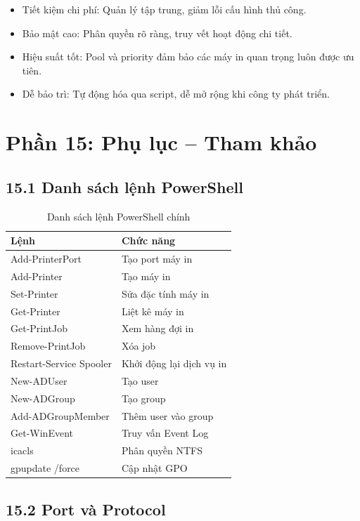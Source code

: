 \begin{itemize}
    \item Tiết kiệm chi phí: Quản lý tập trung, giảm lỗi cấu hình thủ công.
    \item Bảo mật cao: Phân quyền rõ ràng, truy vết hoạt động chi tiết.
    \item Hiệu suất tốt: Pool và priority đảm bảo các máy in quan trọng luôn được ưu tiên.
    \item Dễ bảo trì: Tự động hóa qua script, dễ mở rộng khi công ty phát triển.
\end{itemize}

\section*{Phần 15: Phụ lục – Tham khảo}

\subsection*{15.1 Danh sách lệnh PowerShell}

\begin{table}[h]
\centering
\begin{tabular}{|l|p{9cm}|}
\hline
\textbf{Lệnh} & \textbf{Chức năng} \\
\hline
Add-PrinterPort & Tạo port máy in \\
\hline
Add-Printer & Tạo máy in \\
\hline
Set-Printer & Sửa đặc tính máy in \\
\hline
Get-Printer & Liệt kê máy in \\
\hline
Get-PrintJob & Xem hàng đợi in \\
\hline
Remove-PrintJob & Xóa job \\
\hline
Restart-Service Spooler & Khởi động lại dịch vụ in \\
\hline
New-ADUser & Tạo user \\
\hline
New-ADGroup & Tạo group \\
\hline
Add-ADGroupMember & Thêm user vào group \\
\hline
Get-WinEvent & Truy vấn Event Log \\
\hline
icacls & Phân quyền NTFS \\
\hline
gpupdate /force & Cập nhật GPO \\
\hline
\end{tabular}
\caption{Danh sách lệnh PowerShell chính}
\end{table}

\subsection*{15.2 Port và Protocol}

